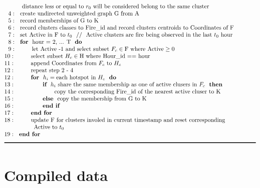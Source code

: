 \documentclass{monashthesis}
\begin{document}
\begin{table}
\begin{align*}
&~~~~~~~~~\text{distance less or equal to }r_0~\text{will be considered belong to the same cluster} \\[-1\jot]
&~~4:~~\text{create undirected unweighted graph G from A}\\[-1\jot]
&~~5:~~\text{record memberships of G to K}\\[-1\jot]
&~~6:~~\text{record clusters classes to Fire\textunderscore id and record clusters centroids to Coordinates of F}\\[-1\jot]
&~~7:~~\text{set Active in F to }t_0~~//~~\text{Active clusters are fire being observed in the last }t_0~\text{hour}\\[-1\jot]
&~~8:~~\textbf{for}~~\text{hour = 2, ... T}~~\textbf{do} \\[-1\jot]
&~~9:~~~~~~~~\text{let Active -1 and select subset }F_c \in \text{F where Active} \geq 0\\[-1\jot]
&10:~~~~~~~~\text{select subset }H_c \in \text{H where Hour\textunderscore id == hour}\\[-1\jot]
&11:~~~~~~~~\text{append Coordinates from }F_c~\text{to}~H_c\\[-1\jot]
&12:~~~~~~~~\text{repeat step 2 - 4}\\[-1\jot]
&12:~~~~~~~~\textbf{for}~~h_i = \text{each hotspot in }H_c~~\textbf{do}\\[-1\jot]
&13:~~~~~~~~~~~~~~\textbf{if}~~h_i~\text{share the same membership as one of active clusers in }F_c~~\textbf{then}\\[-1\jot]
&14:~~~~~~~~~~~~~~~~~~~~\text{copy the corresponding Fire\textunderscore id of the nearest active cluser to K}\\[-1\jot]
&15:~~~~~~~~~~~~~~\textbf{else}~~\text{copy the membership from G to K}\\[-1\jot]
&16:~~~~~~~~~~~~~~\textbf{end if}\\[-1\jot]
&17:~~~~~~~~\textbf{end for}\\[-1\jot]
&18:~~~~~~~~\text{update F for clusters involed in current timestamp and reset corresponding}\\[-1\jot]
&~~~~~~~~~~~~~~~\text{Active to }t_0\\[-1\jot]
&19:~~\textbf{end for}\\[-1\jot]
&\rule{150mm}{0.5mm}
\end{align*}
\end{table}

\hypertarget{compiled-data}{%
\section{Compiled data}\label{compiled-data}}
\end{document}
